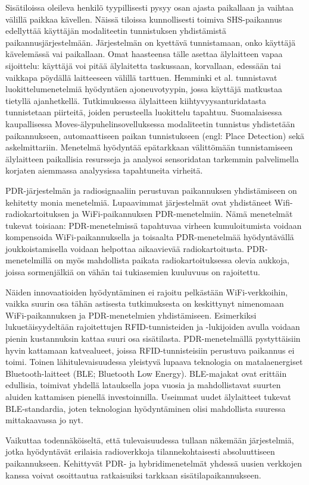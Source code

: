 Sisätiloissa oleileva henkilö tyypillisesti pysyy osan ajasta paikallaan
ja vaihtaa välillä paikkaa kävellen. Näissä tiloissa kunnollisesti toimiva
SHS-paikannus edellyttää käyttäjän modaliteetin
tunnistuksen yhdistämistä paikannusjärjestelmään.
Järjestelmän on kyettävä tunnistamaan, onko käyttäjä kävelemässä vai paikallaan.
Omat haasteensa tälle asettaa älylaitteen vapaa sijoittelu: käyttäjä voi
pitää älylaitetta taskussaan, korvallaan, edessään tai vaikkapa pöydällä
laitteeseen välillä tarttuen. Hemminki et al. \cite{hemminki2013} tunnistavat
luokittelumenetelmiä hyödyntäen ajoneuvotyypin, jossa käyttäjä matkustaa
tietyllä ajanhetkellä. Tutkimuksessa älylaitteen kiihtyvyysanturidatasta
tunnistetaan piirteitä, joiden perusteella luokittelu tapahtuu. Suomalaisessa
kaupallisessa Moves-älypuhelinsovelluksessa modaliteetin tunnistus yhdistetään
paikannukseen, automaattiseen paikan tunnistukseen (engl: Place Detection)
sekä askelmittariin. Menetelmä hyödyntää epätarkkaan välittömään tunnistamiseen
älylaitteen paikallisia resursseja ja analysoi sensoridatan tarkemmin
palvelimella korjaten aiemmassa analyysissa tapahtuneita virheitä.

PDR-järjestelmän ja radiosignaaliin perustuvan paikannuksen yhdistämiseen on
kehitetty monia menetelmiä. Lupaavimmat järjestelmät ovat yhdistäneet
Wifi-radiokartoituksen ja WiFi-paikannuksen PDR-menetelmiin.
Nämä menetelmät tukevat toisiaan: PDR-menetelmissä tapahtuvaa virheen
kumuloitumista voidaan kompensoida WiFi-paikannuksella ja toisaalta
PDR-menetelmää hyödyntävällä joukkoistamisella voidaan helpottaa
aikaavievää radiokartoitusta. PDR-menetelmillä on myös mahdollista paikata
radiokartoituksessa olevia aukkoja, joissa sormenjälkiä on vähän tai 
tukiasemien kuuluvuus on rajoitettu.

Näiden innovaatioiden hyödyntäminen ei rajoitu pelkästään WiFi-verkkoihin,
vaikka suurin osa tähän astisesta tutkimuksesta on keskittynyt
nimenomaan WiFi-paikannuksen ja PDR-menetelmien yhdistämiseen. Esimerkiksi
lukuetäisyydeltään rajoitettujen RFID-tunnisteiden ja -lukijoiden avulla
voidaan pienin kustannuksin kattaa suuri osa sisätilasta. PDR-menetelmällä
pystyttäisiin hyvin kattamaan katvealueet, joissa RFID-tunnisteisiin
perustuva paikannus ei toimi. Toinen lähitulevaisuudessa yleistyvä lupaava
teknologia on matalaenergiset Bluetooth-laitteet (BLE; Bluetooth Low Energy).
BLE-majakat ovat erittäin edullisia, toimivat yhdellä latauksella jopa
vuosia ja mahdollistavat suurten aluiden kattamisen pienellä investoinnilla.
Useimmat uudet älylaitteet tukevat BLE-standardia, joten teknologian
hyödyntäminen olisi mahdollista suuressa mittakaavassa jo nyt.

Vaikuttaa todennäköiseltä, että tulevaisuudessa tullaan näkemään
järjestelmiä, jotka hyödyntävät erilaisia radioverkkoja
tilannekohtaisesti absoluuttiseen paikannukseen. Kehittyvät PDR- ja
hybridimenetelmät yhdessä uusien verkkojen kanssa voivat osoittautua
ratkaisuiksi tarkkaan sisätilapaikannukseen.
